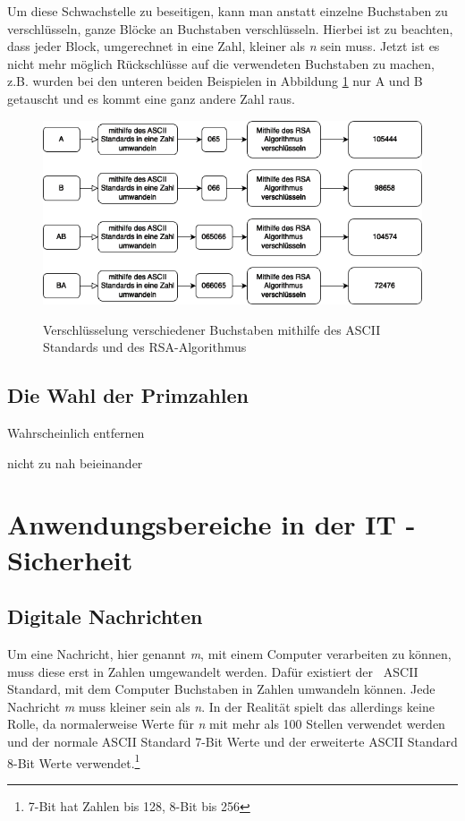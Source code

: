 \documentclass[12pt,a4paper]{scrartcl}
\begin{document}
	Um diese Schwachstelle zu beseitigen, kann man anstatt einzelne Buchstaben zu verschlüsseln, ganze Blöcke an Buchstaben verschlüsseln. Hierbei ist zu beachten, dass jeder Block, umgerechnet in eine Zahl, kleiner als \textit{n} sein muss. Jetzt ist es nicht mehr möglich Rückschlüsse auf die verwendeten Buchstaben zu machen, z.B. wurden bei den unteren beiden Beispielen in Abbildung \ref{fig:figure4} nur A und B getauscht und es kommt eine ganz andere Zahl raus.


\begin{figure}		
\includegraphics[scale=0.45]{rsa_mono} \\
\caption{Verschlüsselung verschiedener Buchstaben mithilfe des ASCII Standards und des RSA-Algorithmus}
\label{fig:figure4}
\end{figure}
	
\subsection{Die Wahl der Primzahlen}
\label{chap:primnumberselection}
Wahrscheinlich entfernen

 nicht zu nah beieinander \cite{rowland} \\

\pagebreak

\section{Anwendungsbereiche in der IT - Sicherheit}
	\subsection{Digitale Nachrichten}
Um eine Nachricht, hier genannt \textit{m}, mit einem Computer verarbeiten zu können, muss diese erst in Zahlen umgewandelt werden. Dafür existiert der ~ASCII~ Standard, mit dem Computer Buchstaben in Zahlen umwandeln können. Jede Nachricht \textit{m} muss kleiner sein als \textit{n}. In der Realität spielt das allerdings keine Rolle, da normalerweise Werte für \textit{n} mit mehr als 100 Stellen verwendet werden und der normale ASCII Standard 7-Bit Werte und der erweiterte ASCII Standard 8-Bit Werte verwendet.\footnote{7-Bit hat Zahlen bis 128, 8-Bit bis 256}
	
\end{document}

